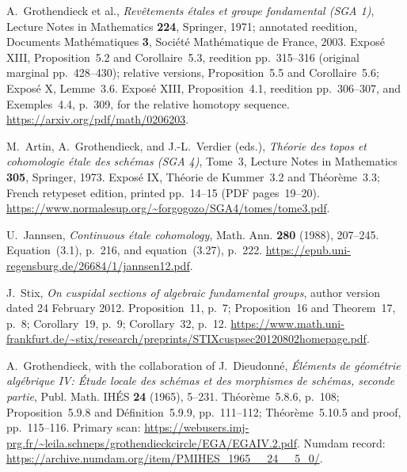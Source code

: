 
A.~Grothendieck et al., \emph{Rev\^etements \'etales et groupe fondamental
(SGA 1)}, Lecture Notes in Mathematics \textbf{224}, Springer, 1971;
annotated reedition, Documents Math\'ematiques \textbf{3},
Soci\'et\'e Math\'ematique de France, 2003.
Expos\'e XIII, Proposition~5.2 and Corollaire~5.3,
reedition pp.~315--316 (original marginal pp.~428--430);
relative versions, Proposition~5.5 and Corollaire~5.6;
Expos\'e X, Lemme~3.6.
Expos\'e XIII, Proposition~4.1, reedition pp.~306--307,
and Exemples~4.4, p.~309, for the relative homotopy sequence.
\url{https://arxiv.org/pdf/math/0206203}.

M.~Artin, A.~Grothendieck, and J.-L.~Verdier (eds.),
\emph{Th\'eorie des topos et cohomologie \'etale des sch\'emas
(SGA 4)}, Tome~3, Lecture Notes in Mathematics \textbf{305},
Springer, 1973. Expos\'e IX, Th\'eorie de Kummer~3.2 and
Th\'eor\`eme~3.3; French retypeset edition, printed pp.~14--15
(PDF pages~19--20).
\url{https://www.normalesup.org/~forgogozo/SGA4/tomes/tome3.pdf}.

U.~Jannsen, \emph{Continuous \'etale cohomology},
Math. Ann. \textbf{280} (1988), 207--245.
Equation~(3.1), p.~216, and equation~(3.27), p.~222.
\url{https://epub.uni-regensburg.de/26684/1/jannsen12.pdf}.

J.~Stix, \emph{On cuspidal sections of algebraic fundamental groups},
author version dated 24 February 2012.
Proposition~11, p.~7; Proposition~16 and Theorem~17, p.~8;
Corollary~19, p.~9; Corollary~32, p.~12.
\url{https://www.math.uni-frankfurt.de/~stix/research/preprints/STIXcuspsec20120802homepage.pdf}.

A.~Grothendieck, with the collaboration of J.~Dieudonn\'e,
\emph{\'El\'ements de g\'eom\'etrie alg\'ebrique IV:
\'Etude locale des sch\'emas et des morphismes de sch\'emas,
seconde partie}, Publ. Math. IH\'ES \textbf{24} (1965), 5--231.
Th\'eor\`eme~5.8.6, p.~108; Proposition~5.9.8 and
D\'efinition~5.9.9, pp.~111--112;
Th\'eor\`eme~5.10.5 and proof, pp.~115--116.
Primary scan:
\url{https://webusers.imj-prg.fr/~leila.schneps/grothendieckcircle/EGA/EGAIV.2.pdf}.
Numdam record: \url{https://archive.numdam.org/item/PMIHES_1965__24__5_0/}.
